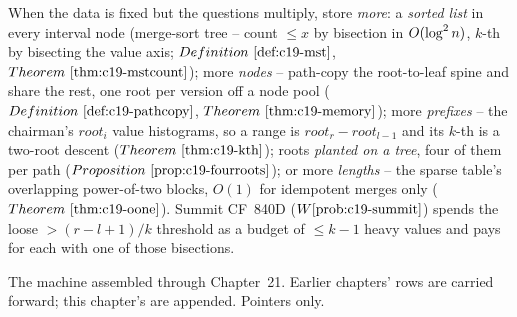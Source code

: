 \begin{recallbox}
When the data is fixed but the questions multiply, store \emph{more}: a \emph{sorted list} in
every interval node (merge-sort tree -- count \(\le x\) by bisection in \(O(\log^2 n)\),
\(k\)-th by bisecting the value axis; \(\defref{c19-mst}\), \(\thmref{c19-mstcount}\)); more
\emph{nodes} -- path-copy the root-to-leaf spine and share the rest, one root per version off a
node pool (\(\defref{c19-pathcopy}\), \(\thmref{c19-memory}\)); more \emph{prefixes} -- the
chairman's \(\mathit{root}_i\) value histograms, so a range is \(\mathit{root}_r-
\mathit{root}_{l-1}\) and its \(k\)-th is a two-root descent (\(\thmref{c19-kth}\)); roots
\emph{planted on a tree}, four of them per path (\(\propref{c19-fourroots}\)); or more
\emph{lengths} -- the sparse table's overlapping power-of-two blocks, \(O(1)\) for idempotent
merges only (\(\thmref{c19-oone}\)). Summit CF~840D (\(\probref{c19-summit}\)) spends the loose
\(>\!(r-l+1)/k\) threshold as a budget of \(\le k-1\) heavy values and pays for each with one
of those bisections.
\end{recallbox}



The machine assembled through Chapter~21. Earlier chapters' rows are carried forward;
this chapter's are appended. Pointers only.

